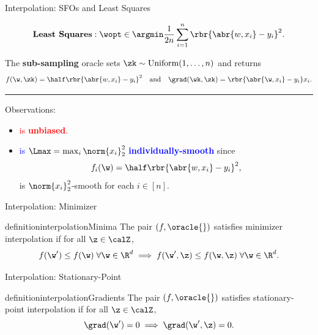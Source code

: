 \documentclass[mathserif,notheorems, hyperref={colorlinks, citecolor=blue, urlcolor=blue, linkcolor=blue}]{beamer}
\begin{document}
    \begin{frame}{Interpolation: SFOs and Least Squares}
        \vspace{-1ex}

        \[ \textbf{Least Squares}: \wopt \in \argmin \frac{1}{2n} \sum_{i=1}^n \rbr{\abr{w, x_i} - y_i}^2. \]
        
        \vspace{2ex} 
        
        The \textbf{sub-sampling} oracle sets \( \zk \sim \text{Uniform}(1, \ldots, n) \) and returns 
        \[ f(\w, \zk) =  \half \rbr{\abr{w, x_i} - y_i}^2 \quad \text{and} \quad \grad(\wk, \zk) = \rbr{\abr{\w, x_i} - y_i} x_i. \]

        \pause 
        \rule{\textwidth}{0.4pt}
        Observations: 
        \begin{itemize}
            \item \textcolor{red}{\oracle{} is \textbf{unbiased}.} 
            \item \textcolor{blue}{\oracle{} is \( \Lmax = \max_{i} \norm{x_i}^2_2 \) \textbf{individually-smooth}} since 
                    \[ f_{i}(\w) = \half \rbr{\abr{w, x_{i}} - y_{i}}^2, \]
                    is \( \norm{x_{i}}_2^2 \)-smooth for each \( i \in [n] \).
        \end{itemize}

    \end{frame}
        


    \begin{frame}{Interpolation: Minimizer}
        \begin{figure}
            \centering 
             
        \end{figure}
        
        \begin{restatable}{definition}{interpolationMinima}\label{def:interpolation-minima}
            The pair \( (f, \oracle{}) \) satisfies minimizer interpolation if for all \( \z \in \calZ \),
            \[ f(\w') \leq f(\w) \; \forall \w \in \R^d \implies f(\w', \z) \leq f(\w, \z) \; \forall \w \in \R^d.  \]
        \end{restatable}

    \end{frame}


    \begin{frame}{Interpolation: Stationary-Point}
        \begin{figure}
           \centering 
             
        \end{figure}
        
        \begin{restatable}{definition}{interpolationGradients}\label{def:interpolation-gradients}
            The pair \( (f, \oracle{}) \) satisfies stationary-point interpolation if for all \( \z \in \calZ \),
            \[ \grad(\w') = 0 \implies \grad(\w', \z) = 0. \]
        \end{restatable}

    \end{frame}
\end{document}
